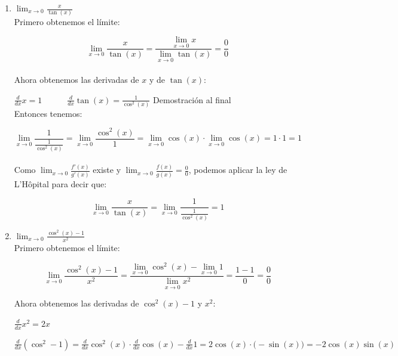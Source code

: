\documentclass[12pt]{article}
\begin{document}
\begin{enumerate}[\hspace{9px} a)]
    \item \(\displaystyle\lim_{x \to 0}\frac{x}{\tan(x)}\)\\

        Primero obtenemos el l\'imite:

        \[\displaystyle\lim_{x \to 0}\frac{x}{\tan(x)} = \frac{\displaystyle\lim_{x \to 0}x}{\displaystyle\lim_{x \to 0}\tan(x)}=\frac{0}{0}\]\\

        Ahora obtenemos las derivadas de $x$ y de $\tan(x)$:

        \(\displaystyle\frac{d}{dx}x=1 \qquad \quad \frac{d}{dx}\tan(x)=\frac{1}{\cos^2(x)}\) \quad Demostraci\'on al final\\
        
        Entonces tenemos:

        \[\displaystyle\lim_{x \to 0}\frac{1}{\displaystyle\frac{1}{\cos^2(x)}}=\lim_{x \to 0}\frac{\cos^2(x)}{1}=\lim_{x \to 0}\cos(x) \cdot \lim_{x \to 0}\cos(x)=1 \cdot 1=1\]\\

        Como \(\displaystyle\lim_{x \to 0}\frac{f'(x)}{g'(x)}\) existe y \(\displaystyle\lim_{x \to 0}\frac{f(x)}{g(x)}=\frac{0}{0}\), podemos aplicar la ley de L'H\^opital para decir que:

        \[\displaystyle\lim_{x \to 0}\frac{x}{\tan(x)}=\lim_{x \to 0}\frac{1}{\displaystyle\frac{1}{\cos^2(x)}}=1\]
    \item \(\displaystyle\lim_{x \to 0}\frac{\cos^2(x)-1}{x^2}\)\\
    
        Primero obtenemos el l\'imite:

        \[\displaystyle\lim_{x \to 0}\frac{\cos^2(x)-1}{x^2} = \frac{\displaystyle\lim_{x \to 0}\cos^2(x)-\lim_{x \to 0}1}{\displaystyle\lim_{x \to 0}x^2}=\frac{1-1}{0}=\frac{0}{0}\]

        Ahora obtenemos las derivadas de $\cos^2(x)-1$ y $x^2$:

        \(\displaystyle\frac{d}{dx}x^2=2x\)

        \(\displaystyle\frac{d}{dx}(\cos^2-1)=\frac{d}{dx}\cos^2(x) \cdot \frac{d}{dx}\cos(x) - \frac{d}{dx}1=2\cos(x)\cdot \big(-\sin(x)\big)=-2\cos(x)\sin(x)\)\\ \\


\end{enumerate}
\end{document}
